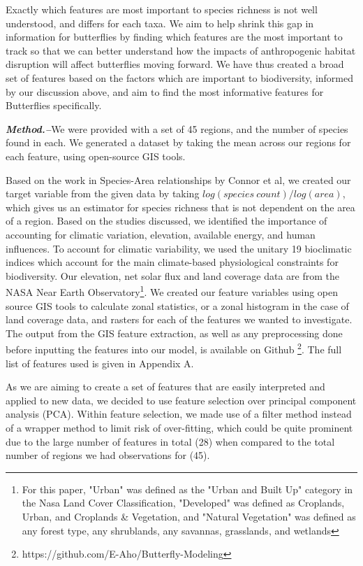 \documentclass[prl,showpacs,superscriptaddress,twocolumn,longbibliography]{revtex4-1}
\begin{document}
Exactly which features are most important to species richness is not well understood, and differs for each taxa. We aim to help shrink this gap in information for butterflies by finding which features are the most important to track so that we can better understand how the impacts of anthropogenic habitat disruption will affect butterflies moving forward. We have thus created a broad set of features based on the factors which are important to biodiversity, informed by our discussion above, and aim to find the most informative features for Butterflies specifically.


\noindent 

{\bf\em Method.--}We were provided with a set of 45 regions, and the number of species found in each. We generated a dataset by taking the mean across our regions for each feature, using open-source GIS tools.

Based on the work in Species-Area relationships by Connor et al\cite{connor_2001_sar}, we created our target variable from the given data by taking $log(species \: count)/log(area)$, which gives us an estimator for species richness that is not dependent on the area of a region. Based on the studies discussed, we identified the importance of accounting for climatic variation, elevation, available energy, and human influences.  To account for climatic variability, we used the unitary 19 bioclimatic indices which account for the main climate-based physiological constraints for biodiversity\cite{hijmans_very_2005}. Our elevation, net solar flux and land coverage data are from the NASA Near Earth Observatory\cite{}\footnote{For this paper, "Urban" was defined as the "Urban and Built Up" category in the Nasa Land Cover Classification, "Developed" was defined as Croplands, Urban, and Croplands & Vegetation, and "Natural Vegetation" was defined as any forest type, any shrublands, any savannas, grasslands, and wetlands}. We created our feature variables using open source GIS tools\cite{QGIS_software} to calculate zonal statistics, or a zonal histogram in the case of land coverage data, and rasters for each of the features we wanted to investigate. The output from the GIS feature extraction, as well as any preprocessing done before inputting the features into our model, is available on Github \footnote{https://github.com/E-Aho/Butterfly-Modeling}. The full list of features used is given in Appendix A.

As we are aiming to create a set of features that are easily interpreted and applied to new data, we decided to use feature selection over principal component analysis (PCA). Within feature selection, we made use of a filter method instead of a wrapper method to limit risk of over-fitting, which could be quite prominent due to the large number of features in total (28) when compared to the total number of regions we had observations for (45).
\end{document}
